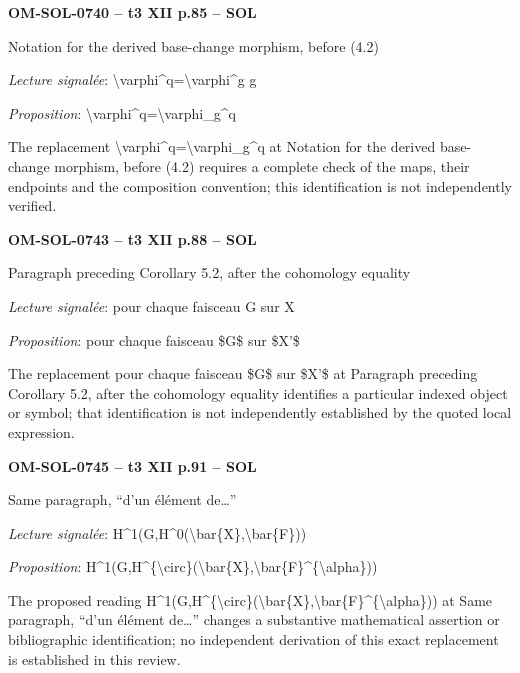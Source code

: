 \par\noindent\textbf{OM-SOL-0740 -- t3 XII p.85 -- SOL}\par
Notation for the derived base-change morphism, before (4.2)\par
\emph{Lecture signalée}: \textbackslash{}varphi\textasciicircum{}q=\allowbreak \textbackslash{}varphi\textasciicircum{}g g\par
\emph{Proposition}: \textbackslash{}varphi\textasciicircum{}q=\allowbreak \textbackslash{}varphi\_g\textasciicircum{}q\par
The replacement \textbackslash{}varphi\textasciicircum{}q=\allowbreak \textbackslash{}varphi\_g\textasciicircum{}q at Notation for the derived base-change morphism, before (4.2) requires a complete check of the maps, their endpoints and the composition convention; this identification is not independently verified.\par
\par\noindent\textbf{OM-SOL-0743 -- t3 XII p.88 -- SOL}\par
Paragraph preceding Corollary 5.2, after the cohomology equality\par
\emph{Lecture signalée}: pour chaque faisceau G sur X\par
\emph{Proposition}: pour chaque faisceau \$G\$ sur \$X'\$\par
The replacement pour chaque faisceau \$G\$ sur \$X'\$ at Paragraph preceding Corollary 5.2, after the cohomology equality identifies a particular indexed object or symbol; that identification is not independently established by the quoted local expression.\par
\par\noindent\textbf{OM-SOL-0745 -- t3 XII p.91 -- SOL}\par
Same paragraph, “d'un élément de…”\par
\emph{Lecture signalée}: H\textasciicircum{}1(G,H\textasciicircum{}0(\textbackslash{}bar\{X\},\textbackslash{}bar\{F\}))\par
\emph{Proposition}: H\textasciicircum{}1(G,H\textasciicircum{}\{\textbackslash{}circ\}(\textbackslash{}bar\{X\},\textbackslash{}bar\{F\}\textasciicircum{}\{\textbackslash{}alpha\}))\par
The proposed reading H\textasciicircum{}1(G,H\textasciicircum{}\{\textbackslash{}circ\}(\textbackslash{}bar\{X\},\textbackslash{}bar\{F\}\textasciicircum{}\{\textbackslash{}alpha\})) at Same paragraph, “d'un élément de…” changes a substantive mathematical assertion or bibliographic identification; no independent derivation of this exact replacement is established in this review.\par
